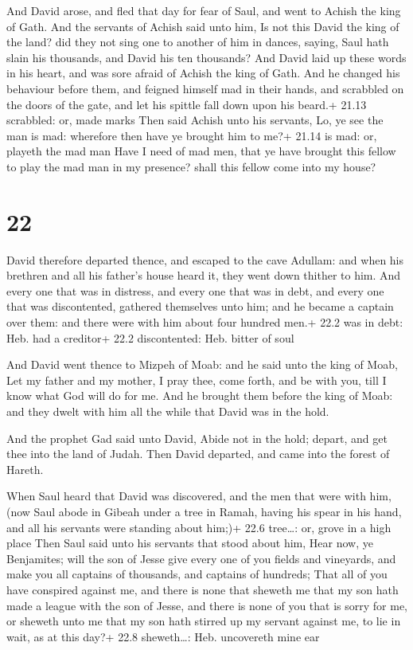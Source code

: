  And David arose, and fled that day for fear of Saul, and
went to Achish the king of Gath.  And the servants of
Achish said unto him, Is not this David the king of the land? did they
not sing one to another of him in dances, saying, Saul hath slain his
thousands, and David his ten thousands?  And David laid up
these words in his heart, and was sore afraid of Achish the king of
Gath.  And he changed his behaviour before them, and
feigned himself mad in their hands, and scrabbled on the doors of the
gate, and let his spittle fall down upon his beard.+ 21.13 scrabbled:
or, made marks  Then said Achish unto his servants, Lo, ye
see the man is mad: wherefore then have ye brought him to me?+ 21.14 is
mad: or, playeth the mad man  Have I need of mad men, that
ye have brought this fellow to play the mad man in my presence? shall
this fellow come into my house?

\hypertarget{section-21}{%
\section{22}\label{section-21}}

 David therefore departed thence, and escaped to the cave
Adullam: and when his brethren and all his father's house heard it, they
went down thither to him.  And every one that was in
distress, and every one that was in debt, and every one that was
discontented, gathered themselves unto him; and he became a captain over
them: and there were with him about four hundred men.+ 22.2 was in debt:
Heb. had a creditor+ 22.2 discontented: Heb. bitter of soul

 And David went thence to Mizpeh of Moab: and he said unto
the king of Moab, Let my father and my mother, I pray thee, come forth,
and be with you, till I know what God will do for me.  And
he brought them before the king of Moab: and they dwelt with him all the
while that David was in the hold.

 And the prophet Gad said unto David, Abide not in the
hold; depart, and get thee into the land of Judah. Then David departed,
and came into the forest of Hareth.

 When Saul heard that David was discovered, and the men
that were with him, (now Saul abode in Gibeah under a tree in Ramah,
having his spear in his hand, and all his servants were standing about
him;)+ 22.6 tree\ldots: or, grove in a high place  Then Saul
said unto his servants that stood about him, Hear now, ye Benjamites;
will the son of Jesse give every one of you fields and vineyards, and
make you all captains of thousands, and captains of hundreds;
 That all of you have conspired against me, and there is
none that sheweth me that my son hath made a league with the son of
Jesse, and there is none of you that is sorry for me, or sheweth unto me
that my son hath stirred up my servant against me, to lie in wait, as at
this day?+ 22.8 sheweth\ldots: Heb. uncovereth mine ear

